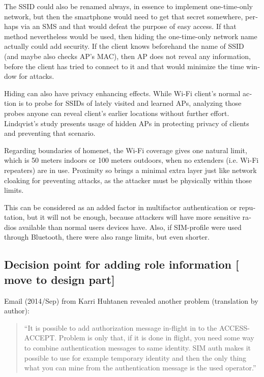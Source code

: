 \documentclass[12pt,a4paper,english]{tutthesis}
\begin{document}
\begin{otherlanguage}{english}
The SSID could also be renamed always, in essence to implement
one-time-only network, but then the smartphone would need to get that
secret somewhere, perhaps via an SMS and that would defeat the purpose
of easy access.  If that method nevertheless would be used, then
hiding the one-time-only network name actually could add security. 
If the client knows beforehand the name of SSID
(and maybe also checks AP's MAC), then AP does not reveal any information,
before the client has tried to connect to it and that would minimize
the time window for attacks.

 Hiding can also have privacy enhancing effects.
While Wi-Fi client's normal action is to probe for SSIDs of lately visited
and learned APs, analyzing those probes anyone can reveal client's earlier
locations without further effort.
Lindqvist's study\cite{hidden-wlan} presents usage of hidden
APs in protecting privacy of clients and  preventing that scenario.



Regarding boundaries of homenet, the Wi-Fi coverage gives 
one natural limit, which is 50 meters indoors or 100 meters outdoors,
when no extenders (i.e. Wi-Fi repeaters) are in use.
Proximity so brings a minimal extra layer just like network cloaking 
for preventing attacks, as the attacker must be physically within those limits.


This can be considered as an added factor in multifactor
authentication or reputation, but it will not be enough, because
attackers will have more sensitive  radios available than normal users
devices have. 
Also, if SIM-profile were used through Bluetooth, there were also
range limits, but even shorter.


\subsection{Decision point for adding role information [ move to design part]}
\label{sec-6-5-7}













Email (2014/Sep) from Karri Huhtanen revealed another
problem (translation by author):
\begin{quote}
``It is possible to add authorization message in-flight in to the
ACCESS-ACCEPT.
Problem is only that, if it is done in flight, you need some way to
combine authentication messages to same identity. SIM auth makes it
possible to use for example temporary identity and then the only thing
what you can mine from the authentication message is the used operator.''
\end{quote}


\end{otherlanguage}
\end{document}
